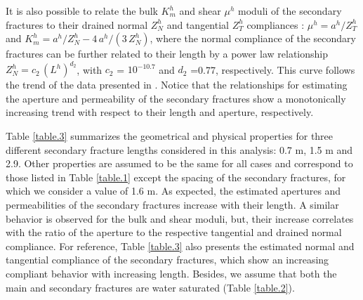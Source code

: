 \documentclass[draft]{agujournal2019}
\begin{document}
It is also possible to relate the bulk $K_m^h$ and shear $\mu^h$ moduli of the secondary fractures to their drained normal $Z_N^h$ and tangential $Z_T^h$ compliances \cite{Nakagawa2007,Rubino2014}: $\mu^h = a^h/Z_T^h$ and $K_m^h =a^h/Z_N^h -4 \, a^h/(3\,Z_N^h)$, where the normal compliance of the secondary fractures can be further related to their length by a power law relationship  $Z_N^h = c_2 \, (L^h) ^{d_2}$, with $c_2$ = $10^{-10.7}$ and $d_2$ =0.77, respectively. This curve follows the trend of the data presented in . Notice that the relationships for estimating the aperture and permeability of the secondary fractures show a monotonically increasing trend with respect to their length and aperture, respectively. 

Table \ref{table.3} summarizes the geometrical and physical properties for three different secondary fracture lengths considered in this analysis: 0.7 m, 1.5 m and 2.9. Other properties are assumed to be the same for all cases and correspond to those listed in Table \ref{table.1} except the spacing of the secondary fractures, for which we consider a value of 1.6 m.  As expected, the estimated apertures and permeabilities of the secondary fractures increase with their length. A similar behavior is observed for the bulk and shear moduli, but, their increase correlates with the ratio of the aperture to the respective tangential and drained normal compliance.  For reference,  Table \ref{table.3} also presents the estimated normal and tangential compliance of the secondary fractures, which show an increasing compliant behavior with increasing length. Besides, we assume that both the main and secondary fractures are water saturated (Table \ref{table.2}).
\end{document}
